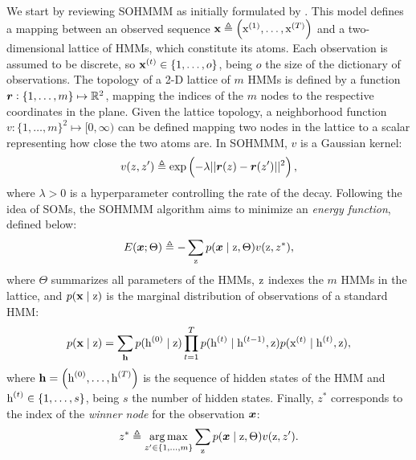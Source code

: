 We start by reviewing SOHMMM as initially formulated by \citet{Ferles2008}. This model defines a mapping between an observed sequence ${\mathbf{x}} \triangleq \left({\textnormal{x}}^{(1)}, \dots, {\textnormal{x}}^{(T)} \right)$ and a two-dimensional lattice of HMMs, which constitute its atoms. Each observation is assumed to be discrete, so ${\mathbf{x}}^{(t)} \in \{1,\dots,o\}$, being $o$ the size of the dictionary of observations. The topology of a 2-D lattice of $m$ HMMs is defined by a function ${\bm{r}}: \{1, \dots, m\} \mapsto \mathbb{R}^2$, mapping the indices of the $m$ nodes to the respective coordinates in the plane. Given the lattice topology, a neighborhood function $v: \{1, \dots, m\}^2 \mapsto [0, \infty)$ can be defined mapping two nodes in the lattice to a scalar representing how close the two atoms are. In SOHMMM, $v$ is a Gaussian kernel:
\begin{equation}
\label{eq:sohmmm_distance}
v(z,z') \triangleq \exp\left(-\lambda||{\bm{r}}(z)-{\bm{r}}(z')||^{2}\right),
\end{equation}
where $\lambda > 0$ is a hyperparameter controlling the rate of the decay.
Following the idea of SOMs, the SOHMMM algorithm aims to minimize an \emph{energy function}, defined below:
\begin{equation}
\label{eq:sohmmm_energy}
E({\bm{x}}; \Theta) \triangleq -\sum_{{\textnormal{z}}} p({\bm{x}} \mid {\textnormal{z}}, \Theta)v({\textnormal{z}}, z^*),
\end{equation}
where $\Theta$ summarizes all parameters of the HMMs, ${\textnormal{z}}$ indexes the $m$ HMMs in the lattice, and $p({\mathbf{x}} \mid {\textnormal{z}})$ is the marginal distribution of observations of a standard HMM:
\begin{equation}
\label{eq:sohmmm_hmm}
p({\mathbf{x}} \mid {\textnormal{z}}) = \sum_{{\mathbf{h}}} p({\textnormal{h}}^{(0)} \mid {\textnormal{z}}) \prod_{t=1}^T p({\textnormal{h}}^{(t)} \mid {\textnormal{h}}^{(t-1)},{\textnormal{z}}) p({\textnormal{x}}^{(t)} \mid {\textnormal{h}}^{(t)},{\textnormal{z}}),
\end{equation}
where ${\mathbf{h}} = \left({\textnormal{h}}^{(0)},\dots,{\textnormal{h}}^{(T)}\right)$ is the sequence of hidden states of the HMM and ${\textnormal{h}}^{(t)} \in \{1, \dots, s\}$, being $s$ the number of hidden states. Finally, $z^*$ corresponds to the index of the \emph{winner node} for the observation ${\bm{x}}$:
\begin{equation}
\label{eq:sohmmm_winner}
z^* \triangleq \operatorname*{arg\,max}_{z' \in \{1,\dots,m\}} \sum_{{\textnormal{z}}} p({\bm{x}} \mid {\textnormal{z}}, \Theta)v({\textnormal{z}}, z').
\end{equation}

